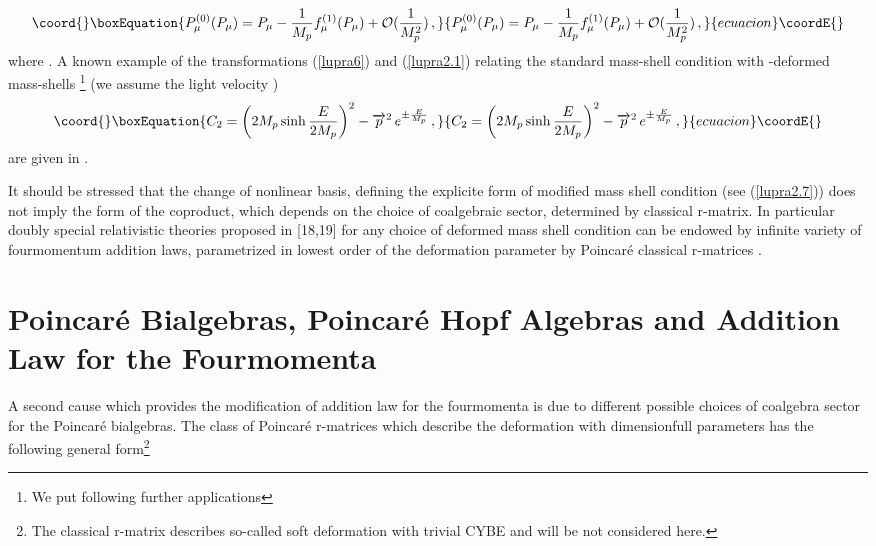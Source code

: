 \documentclass[a4paper,a4paper]{article}
\begin{document}
\begin{equation}\coord{}\boxEquation{\label{lupra2.9}
  P^{(0)}_\mu  (P_\mu) = P_\mu - \frac{1}{M_p} f^{(1)}_\mu
  (P_\mu)  + {\cal O} ( \frac{1}{M_{p}^2})\, ,
}{P^{(0)}_\mu  (P_\mu) = P_\mu - \frac{1}{M_p} f^{(1)}_\mu
  (P_\mu)  + {\cal O} ( \frac{1}{M_{p}^2})\, ,
}{ecuacion}\coordE{}\end{equation}
where \coordHE{}. A known example of the transformations
(\ref{lupra6}) and (\ref{lupra2.1}) relating the standard
mass-shell condition with \myHighlight{$\kappa$}\coordHE{}-deformed mass-shells
\cite{lrz}\footnote{We  put following further applications \coordHE{}} (we assume the light velocity \coordHE{})
\begin{equation}\coord{}\boxEquation{\label{lupra2.10}
  C_2 = \left(  2M_p \sinh  \frac{E}{2M_p}\right)^2 -
  \overrightarrow{p}^2 \, e^{\pm \frac{E}{M_p}}\, ,
}{C_2 = \left(  2M_p \sinh  \frac{E}{2M_p}\right)^2 -
  \overrightarrow{p}^2 \, e^{\pm \frac{E}{M_p}}\, ,
}{ecuacion}\coordE{}\end{equation}
are given in \cite{klms}.

It should be stressed that the change of nonlinear  basis,
defining the explicite form of modified mass shell condition (see
(\ref{lupra2.7})) does not imply the form of the  coproduct, which
depends on the choice of coalgebraic sector, determined by
classical r-matrix. In particular doubly   special relativistic
theories proposed in  [18,19] for any choice of deformed mass
shell condition  can be endowed by infinite variety of
fourmomentum addition laws, parametrized in lowest order  of the
deformation parameter by Poincar\'{e} classical r-matrices
\cite{zak}.

\section{Poincar\'{e} Bialgebras, Poincar\'{e} Hopf Algebras and
Addition Law for the Fourmomenta}

\setcounter{equation}{0}

A second cause which provides the modification of addition law for
the fourmomenta is due to different possible choices of coalgebra
sector for the Poincar\'{e} bialgebras. The class of Poincar\'{e}
r-matrices which describe the deformation with dimensionfull
parameters has the following general form\footnote{The classical
r-matrix \coordHE{} describes
so-called soft deformation \cite{zak2} with   trivial CYBE and
will be not considered here.}
\end{document}
